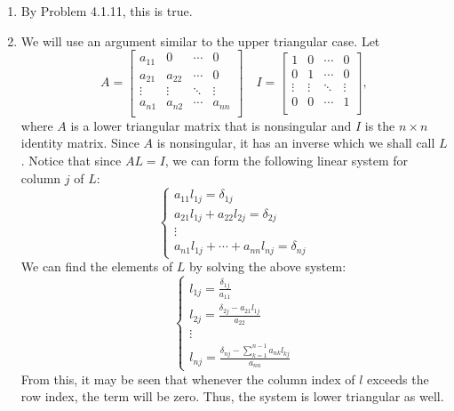 \documentclass{article}
\begin{document}
\begin{enumerate}
\item By Problem 4.1.11, this is true.
\item We will use an argument similar to the upper triangular case. Let 	\begin{equation*}
A = 
\begin{bmatrix}
a_{11} & 0 & \cdots & 0\\
a_{21} & a_{22} &\cdots & 0\\
\vdots & \vdots & \ddots & \vdots\\
a_{n1} & a_{n2} & \cdots & a_{nn}\\
\end{bmatrix}
\quad
I = 
\begin{bmatrix}
1 & 0 & \cdots & 0\\
0 & 1 &\cdots & 0\\
\vdots & \vdots & \ddots & \vdots\\
0 & 0 & \cdots & 1\\
\end{bmatrix},
\end{equation*}
where $A$ is a lower triangular matrix that is nonsingular and $I$ is the $n \times n$ identity matrix. Since $A$ is nonsingular, it has an inverse which we shall call $L$. Notice that since $AL = I$, we can form the following linear system for column $j$ of $L$:
\begin{equation*}
\begin{cases}
	a_{11}l_{1j} = \delta_{1j}\\
	a_{21}l_{1j} + a_{22}l_{2j} = \delta_{2j}\\
	\vdots \\
	a_{n1}l_{1j} + \cdots + a_{nn}l_{nj} = \delta_{nj}
\end{cases}	
\end{equation*}
We can find the elements of $L$ by solving the above system:
\begin{equation*}
\begin{cases}
	l_{1j} = \frac{\delta_{1j}}{a_{11}}\\
	l_{2j} = \frac{\delta_{2j} - a_{21}l_{1j}}{a_{22}}\\
	\vdots \\
	l_{nj} = \frac{\delta_{nj} - \sum_{k = 1}^{n-1} a_{nk}l_{kj}}{a_{nn}}
\end{cases}	
\end{equation*}
From this, it may be seen that whenever the column index of $l$ exceeds the row index, the term will be zero. Thus, the system is lower triangular as well. 


\end{enumerate}
\end{document}
